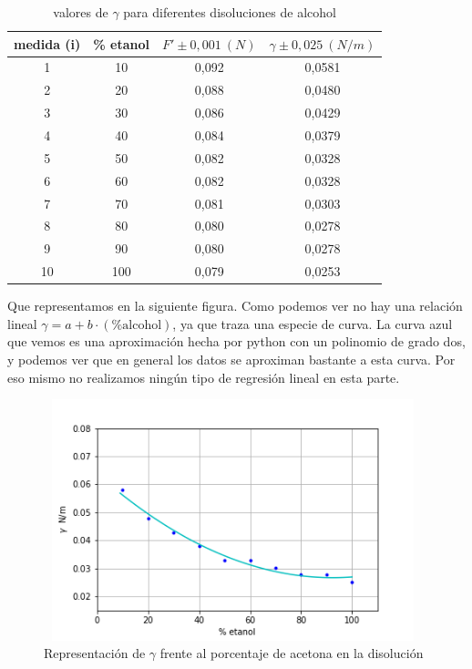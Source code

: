 \documentclass[12pt,a4paper]{book}
\begin{document}
\begin{table}[h!] %
\begin{center}
\begin{tabular}{|c|c|c|c|}
\hline
medida (i) & 	 \% etanol & 	 $F' \pm 0,001  \ (N)$ & 	 $\gamma \pm 0,025 \ (N/m) $ \\ \hline
1 & 	 10 & 	 0,092 & 	 0,0581 \\
2 & 	 20 & 	 0,088 & 	 0,0480 \\
3 & 	 30 & 	 0,086 & 	 0,0429 \\
4 & 	 40 & 	 0,084 & 	 0,0379 \\
5 & 	 50 & 	 0,082 & 	 0,0328 \\
6 & 	 60 & 	 0,082 & 	 0,0328 \\
7 & 	 70 & 	 0,081 & 	 0,0303 \\
8 & 	 80 & 	 0,080 & 	 0,0278 \\
9 & 	 90 & 	 0,080 & 	 0,0278 \\
10 & 	 100 & 	 0,079 & 	 0,0253 \\ \hline
\end{tabular}
\caption{valores de $\gamma$ para diferentes disoluciones de alcohol}

\label{tab:F' vs acetona}
\end{center}
\end{table}

Que representamos en la siguiente figura. Como podemos ver no hay una relación lineal $\gamma=a+b\cdot(\% \mathrm{alcohol})$, ya que traza una especie de curva. La curva azul que vemos es una aproximación hecha por python con un polinomio de grado dos, y podemos ver que en general los datos se aproximan bastante a esta curva. Por eso mismo no realizamos ningún tipo de regresión lineal en esta parte.

\begin{figure}[h!] %
\centering
\includegraphics[width=11cm, height=7cm]{plot2-tensionsuperficial.png}
\caption{Representación de $\gamma$ frente al porcentaje de acetona en la disolución}
\label{fig:plot2-tensionsuperficial}
\end{figure}
\end{document}
